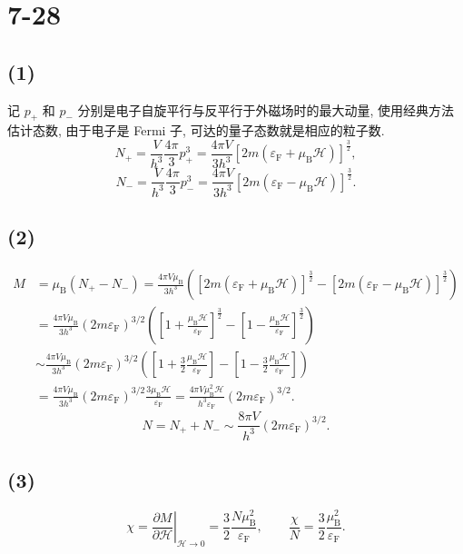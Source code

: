\documentclass[
    lang=cn,
    column=onecolumn
]{spArticle}
\begin{document}
    \section{7-28}
        \subsection{(1)}
            记 $p_+$ 和 $p_-$ 分别是电子自旋平行与反平行于外磁场时的最大动量, 使用经典方法估计态数, 由于电子是 Fermi 子, 可达的量子态数就是相应的粒子数.
            $$
            N_+=\frac{V}{h^3}\frac{4\pi}{3}p_{+}^{3}=\frac{4\pi V}{3h^3}\left[ 2m\left( \varepsilon _{\mathrm{F}}+\mu _{\mathrm{B}}\mathscr{H} \right) \right] ^{\frac{3}{2}},
            $$
            $$
            N_-=\frac{V}{h^3}\frac{4\pi}{3}p_{-}^{3}=\frac{4\pi V}{3h^3}\left[ 2m\left( \varepsilon _{\mathrm{F}}-\mu _{\mathrm{B}}\mathscr{H} \right) \right] ^{\frac{3}{2}}.
            $$
        \subsection{(2)}
            \begin{align*}
                M&=\mu _{\mathrm{B}}\left( N_+-N_- \right) =\frac{4\pi V\mu _{\mathrm{B}}}{3h^3}\left( \left[ 2m\left( \varepsilon _{\mathrm{F}}+\mu _{\mathrm{B}}\mathscr{H} \right) \right] ^{\frac{3}{2}}-\left[ 2m\left( \varepsilon _{\mathrm{F}}-\mu _{\mathrm{B}}\mathscr{H} \right) \right] ^{\frac{3}{2}} \right)
                \\
                &=\frac{4\pi V\mu _{\mathrm{B}}}{3h^3}\left( 2m\varepsilon _{\mathrm{F}} \right) ^{3/2}\left( \left[ 1+\frac{\mu _{\mathrm{B}}\mathscr{H}}{\varepsilon _{\mathrm{F}}} \right] ^{\frac{3}{2}}-\left[ 1-\frac{\mu _{\mathrm{B}}\mathscr{H}}{\varepsilon _{\mathrm{F}}} \right] ^{\frac{3}{2}} \right)
                \\
                &\sim \frac{4\pi V\mu _{\mathrm{B}}}{3h^3}\left( 2m\varepsilon _{\mathrm{F}} \right) ^{3/2}\left( \left[ 1+\frac{3}{2}\frac{\mu _{\mathrm{B}}\mathscr{H}}{\varepsilon _{\mathrm{F}}} \right] -\left[ 1-\frac{3}{2}\frac{\mu _{\mathrm{B}}\mathscr{H}}{\varepsilon _{\mathrm{F}}} \right] \right)
                \\
                &=\frac{4\pi V\mu _{\mathrm{B}}}{3h^3}\left( 2m\varepsilon _{\mathrm{F}} \right) ^{3/2}\frac{3\mu _{\mathrm{B}}\mathscr{H}}{\varepsilon _{\mathrm{F}}}=\frac{4\pi V\mu _{\mathrm{B}}^{2}\mathscr{H}}{h^3\varepsilon _{\mathrm{F}}}\left( 2m\varepsilon _{\mathrm{F}} \right) ^{3/2}.
            \end{align*}
            $$
            N=N_++N_-\sim \frac{8\pi V}{h^3}\left( 2m\varepsilon _{\mathrm{F}} \right) ^{3/2}.
            $$
        \subsection{(3)}
            $$
            \chi =\left. \frac{\partial M}{\partial \mathscr{H}} \right|_{\mathscr{H} \rightarrow 0}=\frac{3}{2}\frac{N\mu _{\mathrm{B}}^{2}}{\varepsilon _{\mathrm{F}}},\qquad \frac{\chi}{N}=\frac{3}{2}\frac{\mu _{\mathrm{B}}^{2}}{\varepsilon _{\mathrm{F}}}.
            $$
\end{document}
